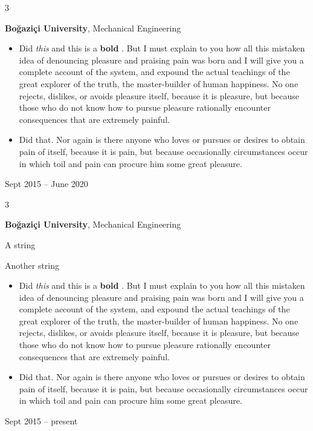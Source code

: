 \documentclass[10pt, letterpaper]{article}
\newenvironment{summary}{
    \begin{description}[
        topsep=0.10 cm,
        parsep=0.10 cm,
        partopsep=0pt,
        itemsep=0pt,
        leftmargin=0.4 cm + 10pt
    ]
}{
    \end{description}
} %
\newenvironment{highlights}{
    \begin{itemize}[
        topsep=0.10 cm,
        parsep=0.10 cm,
        partopsep=0pt,
        itemsep=0pt,
        leftmargin=0.4 cm + 10pt
    ]
}{
    \end{itemize}
} %
\newenvironment{threecolentry}[3][]{
    \onecolentry
    \def\thirdColumn{#3}
    \setcolumnwidth{1 cm, \fill, 4.5 cm}
    \begin{paracol}{3}
    {\raggedright #2} \switchcolumn
}{
    \switchcolumn \raggedleft \thirdColumn
    \end{paracol}
    \endonecolentry
} %
\let\hrefWithoutArrow\href
\renewcommand{\href}[2]{\hrefWithoutArrow{#1}{\ifthenelse{\equal{#2}{}}{ }{#2 }\raisebox{.15ex}{\footnotesize \faExternalLink*}}}
\begin{document}
        \begin{threecolentry}{\textbf{}}{
            Sept 2015 – June 2020
        }
            \textbf{Boğaziçi University}, Mechanical Engineering
            \begin{highlights}
                \item Did \textit{this} and this is a \textbf{bold} \href{https://example.com}{link}. But I must explain to you how all this mistaken idea of denouncing pleasure and praising pain was born and I will give you a complete account of the system, and expound the actual teachings of the great explorer of the truth, the master-builder of human happiness. No one rejects, dislikes, or avoids pleasure itself, because it is pleasure, but because those who do not know how to pursue pleasure rationally encounter consequences that are extremely painful.
                \item Did that. Nor again is there anyone who loves or pursues or desires to obtain pain of itself, because it is pain, but because occasionally circumstances occur in which toil and pain can procure him some great pleasure.
            \end{highlights}
        \end{threecolentry}

        \vspace{0.2 cm}

        \begin{threecolentry}{\textbf{}}{
            Sept 2015 – present
        }
            \textbf{Boğaziçi University}, Mechanical Engineering
            \begin{summary}
                \item A string
                \item Another string
            \end{summary}
            \begin{highlights}
                \item Did \textit{this} and this is a \textbf{bold} \href{https://example.com}{link}. But I must explain to you how all this mistaken idea of denouncing pleasure and praising pain was born and I will give you a complete account of the system, and expound the actual teachings of the great explorer of the truth, the master-builder of human happiness. No one rejects, dislikes, or avoids pleasure itself, because it is pleasure, but because those who do not know how to pursue pleasure rationally encounter consequences that are extremely painful.
                \item Did that. Nor again is there anyone who loves or pursues or desires to obtain pain of itself, because it is pain, but because occasionally circumstances occur in which toil and pain can procure him some great pleasure.
            \end{highlights}
        \end{threecolentry}
\end{document}
